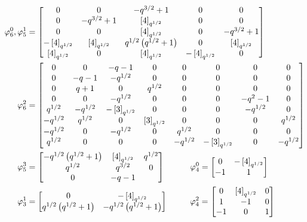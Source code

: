 \documentclass{amsart}
\begin{document}
\begin{figure}
\iffalse
\def\tho{\Phi_3(q^{1/2})}
\def\tht{\brk{3}_{q^{1/2}}}
\def\to{q^{1/2}\brk{2}_{q^{1/2}}}
Define the following coefficients:
\begin{align*}
  \tho &:= q^{3/2} + 1\\
  \tht &:= q^{3/2} + q + q^{1/2} + 1\\
  \to &:= q + q^{1/2}
\end{align*}
\fi

\def\tho{q^{3/2} + 1}
\def\tht{\brk{4}_{q^{1/2}}}
\def\to{q^{1/2}\prn{q^{1/2} + 1}}
\begin{align*}
  \varphi_6^0, \varphi_5^1 &= \begin{bmatrix}
    0 & 0 & -\tho & 0 & 0\\
    0 & -\tho & \tht & 0 & 0\\
    0 & 0 & \tht & 0 & -\tho\\
    -\tht & \tht & \to & 0 & \tht\\
    \tht & 0 & \tht & -\tht & 0
  \end{bmatrix}\\
  \varphi_6^2 &= \begin{bmatrix}
    0 & 0 & - q - 1 & 0 & 0 & 0 & 0 & 0\\
    0 & -q - 1 & -q^{1/2} & 0 & 0 & 0 & 0 & 0\\
    0 & q + 1 & 0 & q^{1/2} & 0 & 0 & 0 & 0\\
    0 & 0 & -q^{1/2} & 0 & 0 & 0 & -q^2 - 1 & 0\\
    q^{1/2} & -q^{1/2} & -\brk{3}_{q^{1/2}} & 0 & 0 & 0 & -q^{1/2} & 0\\
   -q^{1/2} & q^{1/2} & 0 & \brk{3}_{q^{1/2}} &0 & 0 & 0 & q^{1/2}\\
   -q^{1/2} & 0 & -q^{1/2} & 0 & q^{1/2} & 0 & 0 & 0\\
    q^{1/2} & 0 & 0 & 0 & -q^{1/2} & -\brk{3}_{q^{1/2}} & 0 & -q^{1/2}
  \end{bmatrix}\\
  \varphi_5^3 &= \begin{bmatrix}
    -\to & \tht & q^{1/2}\\
    q^{1/2} & q^{3/2} & 0\\
    0 & -q - 1
  \end{bmatrix}  \hspace{30pt} 
  \varphi_4^0 = \begin{bmatrix}
    0 & -\tht\\
    -1 & 1
  \end{bmatrix}\\
  \varphi_3^1 &= \begin{bmatrix}
    0 & -\tht\\
    \to & -\to
  \end{bmatrix} \hspace{27pt}
  \varphi_4^2 = \begin{bmatrix}
    0 & \tht & 0\\
    1 & -1 & 0\\
    -1 & 0 & 1
  \end{bmatrix}
\end{align*}


\end{figure}
\end{document}
